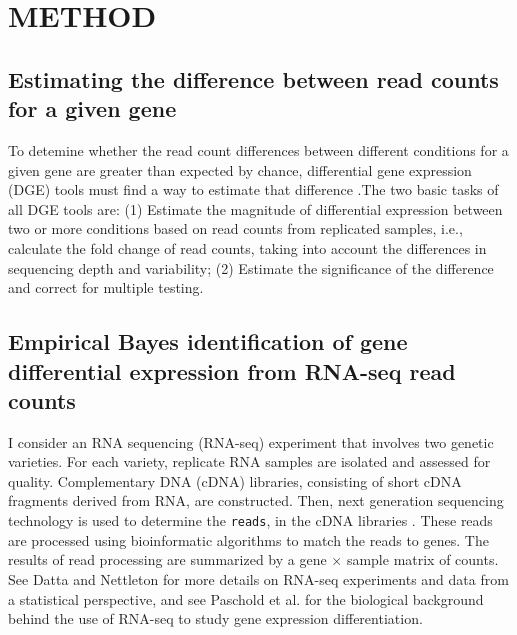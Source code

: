 \documentclass[11pt]{isuthesis}
\begin{document}


\tableofcontents
{} \cleardoublepage {}
{}
\listoftables
\cleardoublepage {} {}
\listoffigures



\cleardoublepage {}  
\cleardoublepage {}         



\newpage
{}




\chapter{METHOD}

\section{Estimating the difference between read counts for a given gene}

To detemine whether the read count differences between different conditions for a given gene are greater than expected by chance, differential gene expression (DGE) tools must find a way to estimate that difference \cite{dundar2015introduction}.The two basic tasks of all DGE tools are: (1) Estimate the magnitude of differential expression between two or more conditions based on read counts from replicated samples, i.e., calculate the fold change of read counts, taking into account the differences in sequencing depth and variability; (2) Estimate the significance of the difference and correct for multiple testing. 

\section{Empirical Bayes identification of gene differential expression from RNA-seq read counts}

I consider an RNA sequencing (RNA-seq) experiment that involves two genetic varieties. For each variety, replicate RNA samples are isolated and assessed for quality. Complementary DNA (cDNA) libraries, consisting of short cDNA fragments derived from RNA, are constructed. Then, next generation sequencing technology is used to determine the {\tt reads}, in the cDNA libraries \cite{niemi2015empirical}. These reads are processed using bioinformatic algorithms to match the reads to genes. The results of read processing are summarized by a gene $\times$ sample matrix of counts. See Datta and Nettleton \cite{datta2014statistical} for more details on RNA-seq experiments and data from a statistical perspective, and see Paschold et al. \cite{paschold2012complementation} for the biological background behind the use of RNA-seq to study gene expression differentiation. 
\end{document}
